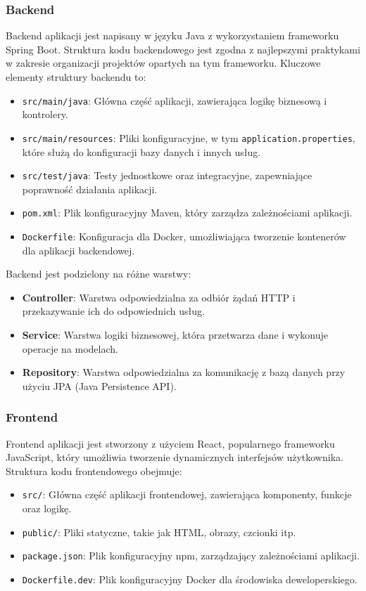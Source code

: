 \subsubsection{Backend}
Backend aplikacji jest napisany w języku Java z wykorzystaniem frameworku Spring Boot. Struktura kodu backendowego jest zgodna z najlepszymi praktykami w zakresie organizacji projektów opartych na tym frameworku. Kluczowe elementy struktury backendu to:
\begin{itemize}
    \item \texttt{src/main/java}: Główna część aplikacji, zawierająca logikę biznesową i kontrolery.
    \item \texttt{src/main/resources}: Pliki konfiguracyjne, w tym \texttt{application.properties}, które służą do konfiguracji bazy danych i innych usług.
    \item \texttt{src/test/java}: Testy jednostkowe oraz integracyjne, zapewniające poprawność działania aplikacji.
    \item \texttt{pom.xml}: Plik konfiguracyjny Maven, który zarządza zależnościami aplikacji.
    \item \texttt{Dockerfile}: Konfiguracja dla Docker, umożliwiająca tworzenie kontenerów dla aplikacji backendowej.
\end{itemize}

Backend jest podzielony na różne warstwy:
\begin{itemize}
    \item \textbf{Controller}: Warstwa odpowiedzialna za odbiór żądań HTTP i przekazywanie ich do odpowiednich usług.
    \item \textbf{Service}: Warstwa logiki biznesowej, która przetwarza dane i wykonuje operacje na modelach.
    \item \textbf{Repository}: Warstwa odpowiedzialna za komunikację z bazą danych przy użyciu JPA (Java Persistence API).
\end{itemize}

\subsubsection{Frontend}
Frontend aplikacji jest stworzony z użyciem React, popularnego frameworku JavaScript, który umożliwia tworzenie dynamicznych interfejsów użytkownika. Struktura kodu frontendowego obejmuje:
\begin{itemize}
    \item \texttt{src/}: Główna część aplikacji frontendowej, zawierająca komponenty, funkcje oraz logikę.
    \item \texttt{public/}: Pliki statyczne, takie jak HTML, obrazy, czcionki itp.
    \item \texttt{package.json}: Plik konfiguracyjny npm, zarządzający zależnościami aplikacji.
    \item \texttt{Dockerfile.dev}: Plik konfiguracyjny Docker dla środowiska deweloperskiego.
\end{itemize}

